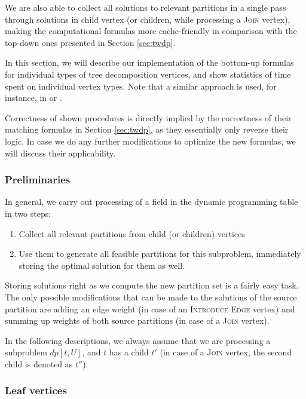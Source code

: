 \documentclass[thesis=M,english,hidelinks]{FITthesis}[2012/10/20]
\theoremstyle{definition}
\begin{document}
We are also able to collect all solutions to relevant partitions in a single pass through solutions in child vertex (or
children, while processing a \textsc{Join} vertex), making the computational formulas more cache-friendly in comparison
with the top-down ones presented in Section \ref{sec:twdp}.

In this section, we will describe our implementation of the bottom-up formulas for individual types of tree
decomposition vertices, and show statistics of time spent on individual vertex types. Note that a similar approach is
used, for instance, in \cite{Bodlaender2012} or \cite{Fafianie2013}.

Correctness of shown procedures is directly implied by the correctness of their matching formulas in Section
\ref{sec:twdp}, as they essentially only reverse their logic. In case we do any further modifications to optimize the
new formulas, we will discuss their applicability.

\subsubsection*{Preliminaries}

In general, we carry out processing of a field in the dynamic programming table in two steps:

\begin{enumerate}
    \item Collect all relevant partitions from child (or children) vertices
    \item Use them to generate all feasible partitions for this subproblem, immediately storing the optimal solution for
        them as well.
\end{enumerate}

Storing solutions right as we compute the new partition set is a fairly easy task. The only possible modifications that
can be made to the solutions of the source partition are adding an edge weight (in case of an \textsc{Introduce Edge}
vertex) and summing up weights of both source partitions (in case of a \textsc{Join} vertex).

In the following descriptions, we always assume that we are processing a subproblem $dp[t, U]$, and $t$ has a child
$t'$ (in case of a \textsc{Join} vertex, the second child is denoted as $t''$).

\subsubsection*{Leaf vertices}
\end{document}
